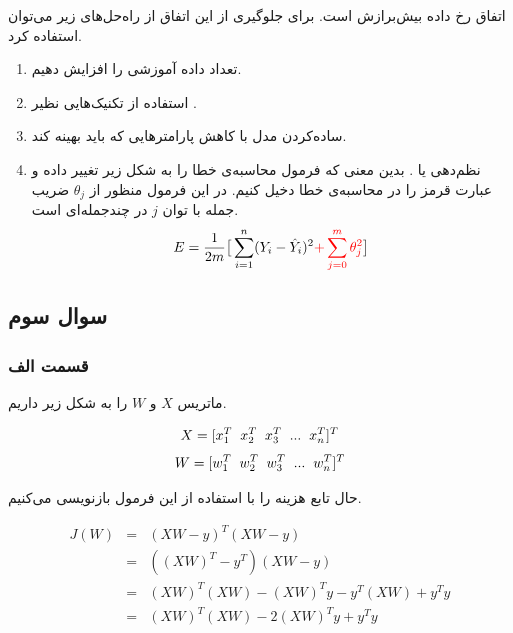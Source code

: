 \documentclass[14pt,a4]{article}
\begin{document}
اتفاق رخ داده بیش‌برازش است. برای جلوگیری از این اتفاق از راه‌حل‌های زیر می‌توان استفاده کرد.

\begin{enumerate}
    \item تعداد داده‌ آموزشی را افزایش دهیم.
    \item استفاده از تکنیک‌هایی نظیر .
    \item ساده‌کردن مدل با کاهش پارامتر‌هایی که باید بهینه کند.
    \item نظم‌دهی یا . بدین معنی که فرمول محاسبه‌ی خطا را به شکل زیر تغییر داده
    و عبارت قرمز را در محاسبه‌ی خطا دخیل کنیم. در این فرمول منظور از $\theta_j$ ضریب جمله‌ با توان $j$
    در چندجمله‌ای است.
    $$E = \frac{1}{2m} \big[ \sum_{i=1}^{n} (Y_i - \hat{Y}_i)^2 \textcolor{red}{+ \sum_{j=0}^{m} \theta_j^2 } \big]$$
\end{enumerate}

\subsection*{سوال سوم}

\subsubsection*{قسمت الف}

ماتریس $X$ و $W$ را به شکل زیر داریم.

$$X = [x_1^T \hspace{0.2cm} x_2^T \hspace{0.2cm} x_3^T \hspace{0.2cm} ...  \hspace{0.2cm} x_n^T]^T$$
$$W = [w_1^T \hspace{0.2cm} w_2^T \hspace{0.2cm} w_3^T \hspace{0.2cm} ...  \hspace{0.2cm} w_n^T]^T$$

حال تابع هزینه را با استفاده از این فرمول بازنویسی می‌کنیم.

\begin{eqnarray*}
    J(W) & = & (XW - y)^T (XW - y) \\
     & = & ((XW)^T - y^T) (XW - y) \\
     & = & (XW)^T(XW) - (XW)^T y - y^T(XW) + y^Ty \\
     & = & (XW)^T(XW) - 2 (XW)^T y + y^Ty \\
\end{eqnarray*}
\end{document}
